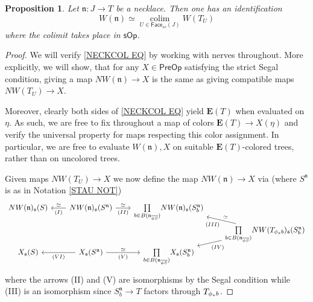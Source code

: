 \documentclass[a4paper,10pt
,draft
]{article}%
\numberwithin{equation}{section}
\numberwithin{figure}{section}
\newtheorem{proposition}[equation]{Proposition}%
\theoremstyle{definition} %
\DeclareMathOperator{\colim}{colim}%
\newcommand{\1}{\ensuremath{\mathbbm 1}}%
\begin{document}
\begin{proposition}\label{NECKCOL PROP}
	Let $\mathfrak{n} \colon J \to T$ be a necklace.
	Then one has an identification
\begin{equation}\label{NECKCOL EQ}
	W(\mathfrak{n})
	\simeq 
	\underset{U \in \mathsf{Face}_{sc}(J)}{\colim}
	W(T_U)
\end{equation}
	where the colimit takes place 
	in $\mathsf{sOp}$.
\end{proposition}



\begin{proof}
	We will verify \eqref{NECKCOL EQ}
	by working with nerves throughout.
	More explicitly, 
	we will show, that for any $X\in \mathsf{PreOp}$
	satisfying the strict Segal condition,
	giving a map
	$NW(\mathfrak{n}) \to X$
	is the same as giving compatible maps
	$NW(T_U) \to X$.

	Moreover, clearly both sides of 
	\eqref{NECKCOL EQ} yield $\boldsymbol{E}(T)$
	when evaluated on $\eta$.
	As such, we are free to fix throughout
	a map of colors $\boldsymbol{E}(T) \to X(\eta)$
	and verify the universal property 
	for maps respecting this color assignment.
	In particular, we are free to 
	evaluate $W(\mathfrak{n}),X$ on suitable 
	$\boldsymbol{E}(T)$-colored trees, 
	rather than on uncolored trees.

	Given maps $NW(T_U) \to X$
	we now define the map $NW(\mathfrak{n}) \to X$ via 
	(where $S^{\mathfrak{n}}$ is as in Notation \ref{STAU NOT})
\begin{equation}\label{LONGMAP EQ}
\begin{tikzcd}[column sep = 20pt, row sep=0]
	NW(\mathfrak{n})_{\mathfrak{s}}(S)
&
	NW(\mathfrak{n})_{\mathfrak{s}}(S^{\mathfrak{n}})
	\ar{l}[swap]{\simeq}{(I)}
	\ar{r}{\simeq}[swap]{(II)}
&
	\underset{b \in B( \mathfrak{n}_{\overline{\phi S}})}{\prod}
	NW(\mathfrak{n})_{\mathfrak{s}}(S^{\mathfrak{n}}_b)
\\
&&&
	\underset{b \in B( \mathfrak{n}_{\overline{\phi S}})}{\prod}
	NW(T_{\phi_{\**}b})_{\mathfrak{s}}(S^{\mathfrak{n}}_b)
	\ar{lu}[swap]{\simeq}{(III)}
	\ar{ld}{(IV)}
\\
	X_{\mathfrak{s}}(S)
&
	X_{\mathfrak{s}}(S^{\mathfrak{n}})
	\ar{r}{\simeq}[swap]{(V)}
	\ar{l}{(VI)}
&
	\underset{b \in B(\mathfrak{n}_{\overline{\phi S}})}{\prod}
	X_{\mathfrak{s}}(S^{\mathfrak{n}}_b)
\end{tikzcd}
\end{equation}
	where the arrows (II) and (V) are isomorphisms by the Segal condition
	while (III) is an isomorphism since 
	$S_b^{\mathfrak{n}} \to T$ factors through 
	$T_{\phi_{\**}b}$.
	

\end{proof}
\end{document}
